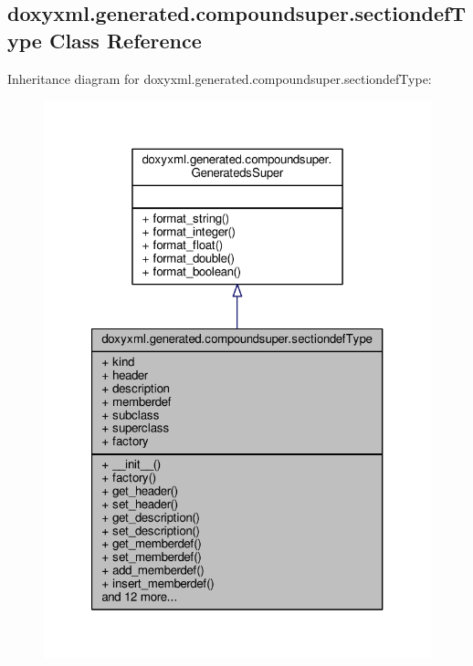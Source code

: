 \subsection{doxyxml.\+generated.\+compoundsuper.\+sectiondef\+Type Class Reference}
\label{classdoxyxml_1_1generated_1_1compoundsuper_1_1sectiondefType}


Inheritance diagram for doxyxml.\+generated.\+compoundsuper.\+sectiondef\+Type\+:
\nopagebreak
\begin{figure}[H]
\begin{center}
\leavevmode
\includegraphics[width=321pt]{d8/dd8/classdoxyxml_1_1generated_1_1compoundsuper_1_1sectiondefType__inherit__graph}
\end{center}
\end{figure}


